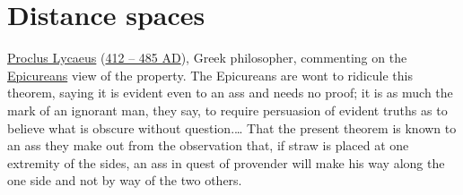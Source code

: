 \chapter{Distance spaces}
\label{app:distance}
\label{app:dspace}
\qboxns
  {
    \href{http://en.wikipedia.org/wiki/Proclus}{Proclus Lycaeus}
    (\href{http://www-history.mcs.st-andrews.ac.uk/Timelines/TimelineA.html}{412 -- 485 AD}),
    Greek philosopher,
    commenting on the 
    \href{http://en.wikipedia.org/wiki/Epicureans}{Epicureans} 
    view of the  property.
    \footnotemark
  }
  {
   The Epicureans are wont to ridicule this theorem, 
   saying it is evident even to an ass and needs no proof;
   it is as much the mark of an ignorant man,
   they say, to require persuasion of evident truths as to believe
   what is obscure without question.\ldots
   That the present theorem is known to an ass they make out from the
   observation that, if straw is placed at one extremity of the sides,
   an ass in quest of provender will make his way along the one side
   and not by way of the two others.
  }
%
